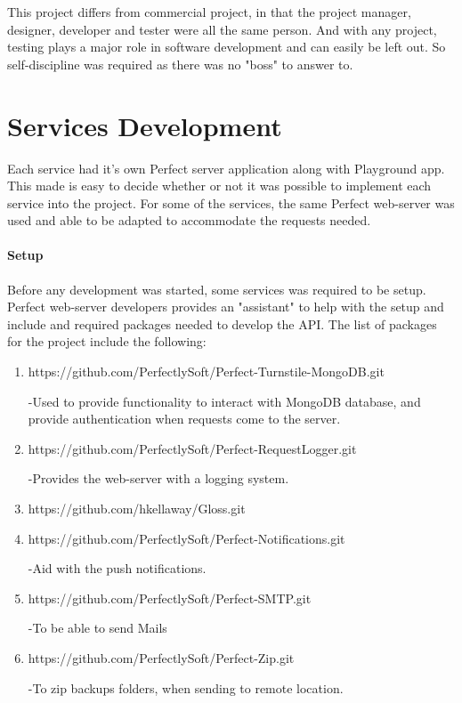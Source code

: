 This project differs from commercial project, in that the project manager, designer, developer and tester were all the same person. And with any project, testing plays a major role in software development and can easily be left out. So self-discipline was required as there was no "boss" to answer to. 

\section{Services Development}

Each service had it's own Perfect server application along with Playground app. This made is easy to decide whether or not it was possible to implement each service into the project. For some of the services, the same Perfect web-server was used and able to be adapted to accommodate the requests needed. 

\paragraph{Setup} Before any development was started, some services was required to be setup. Perfect web-server developers provides an "assistant" to help with the setup and include and required packages needed to develop the API. The list of packages for the project include the following:

\begin{enumerate}
  \item https://github.com/PerfectlySoft/Perfect-Turnstile-MongoDB.git
  
  -Used to provide functionality to interact with MongoDB database, and provide authentication when requests come to the server.
  \item https://github.com/PerfectlySoft/Perfect-RequestLogger.git
  
  -Provides the web-server with a logging system.
  \item https://github.com/hkellaway/Gloss.git
  \item https://github.com/PerfectlySoft/Perfect-Notifications.git
  
  -Aid with the push notifications.
  \item https://github.com/PerfectlySoft/Perfect-SMTP.git
  
  -To be able to send Mails
  \item https://github.com/PerfectlySoft/Perfect-Zip.git
  
  -To zip backups folders, when sending to remote location.
\end{enumerate}

